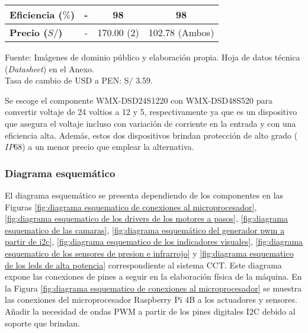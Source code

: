 \begin{savenotes}
\begin{mytable}[H]
\begin{tabular}{l|c|c|c|}
{\begin{minipage}{\myforthmaxsizeofcontenttable}
					\textbf{Eficiencia ($\%$)}
				\end{minipage}
			} & - & 98 & 98 \\ \hline
			\multicolumn{1}{|l|}{
				\begin{minipage}{\myforthmaxsizeofcontenttable}	
					\textbf{Precio ($S/$)}
				\end{minipage}
			} & - & 170.00 (2) & 102.78 (Ambos)  \\ \hline		
		\end{tabular}
		\begin{myflushcenteraftertable}	
			Fuente: Imágenes de dominio público y elaboración propia. Hoja de datos técnica (\textit{Datasheet}) en el Anexo.\\
			Tasa de cambio de USD a PEN: S/ 3.59.
		\end{myflushcenteraftertable}
	\end{mytable}
\end{savenotes}

Se escoge el componente WMX-DSD24S1220 con WMX-DSD48S520 para convertir voltaje de 24 voltios a 12 y 5, respectivamente ya que es un dispositivo que asegura el voltaje incluso con variación de corriente en la entrada y con una eficiencia alta. Además, estos dos dispositivos brindan protección de alto grado ($IP68$) a un menor precio que emplear la alternativa.


\subsubsection{Diagrama esquemático} 

El diagrama esquemático se presenta dependiendo de los componentes en las Figuras \ref{fig:diagrama esquematico de conexiones al microprocesador}, \ref{fig:diagrama esquematico de los drivers de los motores a pasos}, \ref{fig:diagrama esquematico de las camaras}, \ref{fig:diagrama esquemático del generador pwm a partir de i2c}, \ref{fig:diagrama esquematico de los indicadores visuales}, \ref{fig:diagrama esquematico de los sensores de presion e infrarrojo} y \ref{fig:diagrama esquematico de los leds de alta potencia} correspondiente al sistema CCT. Este diagrama expone las conexiones de pines a seguir en la elaboración física de la máquina. En la Figura \ref{fig:diagrama esquematico de conexiones al microprocesador} se muestra las conexiones del microprocesador Raspberry Pi 4B a los actuadores y sensores. Añadir la necesidad de ondas PWM a partir de los pines digitales I2C debido al soporte que brindan.

